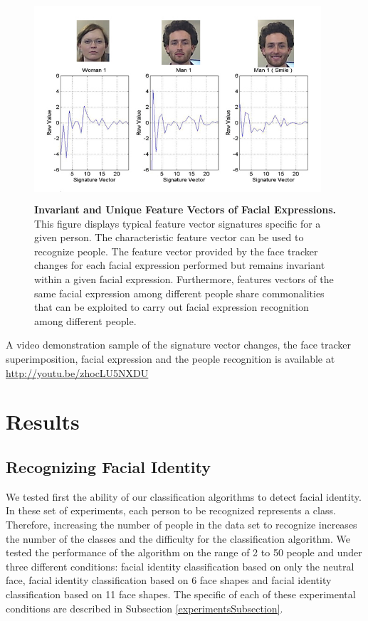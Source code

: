 \documentclass[]{article}
\begin{document}
\begin{figure}[ht]
\begin{center}
\vspace{-3mm}
\includegraphics[width=0.95\textwidth,height=75mm]{figures/comparationBetweenFaces2.jpg}
\end{center}
\caption{\textbf{Invariant and Unique Feature Vectors of Facial Expressions.} This figure displays typical feature 
vector signatures specific for a given person. The characteristic feature vector can be used to recognize people. The
feature vector provided by the face tracker changes for each facial expression performed but remains invariant within a
given facial expression. Furthermore, features vectors of the same facial expression among different people share commonalities that
can be exploited to carry out facial expression recognition among different people.}
\label{comparationBetweenFaces}
\end{figure}

A video demonstration sample of the signature vector changes, the face tracker
superimposition, facial expression and the people recognition is available at
\url{ http://youtu.be/zhocLU5NXDU}

\section{Results}

\subsection{Recognizing Facial Identity}
We tested first the ability of our classification algorithms to detect facial identity. In these set of experiments,
each person to be recognized represents a class. Therefore, increasing the number of people in the data set to recognize
increases the number of the classes and the difficulty for the classification algorithm. We tested the performance of
the algorithm on the range of 2 to 50 people and under three different conditions: facial identity classification based
on only the neutral face, facial identity classification based on 6 face shapes and facial identity classification based
on 11 face shapes. The specific of each of these experimental conditions are described in Subsection
\ref{experimentsSubsection}.
\end{document}
